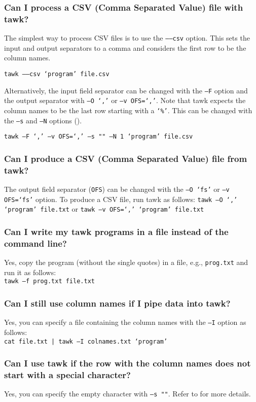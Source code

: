 \documentclass[documentation]{subfiles}
\begin{document}
\subsubsection{Can I process a CSV (Comma Separated Value) file with tawk?}
The simplest way to process CSV files is to use the {\tt --{}--csv} option.
This sets the input and output separators to a comma and considers the first row to be the column names.
\begin{center}
    {\tt tawk --{}--csv `program' file.csv}
\end{center}

Alternatively, the input field separator can be changed with the {\tt --F} option and the output separator with {\tt --O `,'} or {\tt --v OFS=`,'}.
Note that tawk expects the column names to be the last row starting with a {\tt `\%'}.
This can be changed with the {\tt --s} and {\tt --N} options ().
\begin{center}
    {\tt tawk --F `,' --v OFS=`,' --s "" --N 1 `program' file.csv}
\end{center}

\subsubsection{Can I produce a CSV (Comma Separated Value) file from tawk?}
The output field separator ({\tt OFS}) can be changed with the {\tt --O `fs'} or {\tt --v OFS=`fs'} option.
To produce a CSV file, run tawk as follows: {\tt tawk --O `,' `program' file.txt} or {\tt tawk --v OFS=`,' `program' file.txt}

\subsubsection{Can I write my tawk programs in a file instead of the command line?}
Yes, copy the program (without the single quotes) in a file, e.g., {\tt prog.txt} and run it as follows:\\
{\tt tawk --f prog.txt file.txt}

\subsubsection{Can I still use column names if I pipe data into tawk?}
Yes, you can specify a file containing the column names with the {\tt --I} option as follows:\\
{\tt cat file.txt | tawk --I colnames.txt `program'}

\subsubsection{Can I use tawk if the row with the column names does not start with a special character?}
Yes, you can specify the empty character with {\tt --s ""}.
Refer to  for more details.
\end{document}
